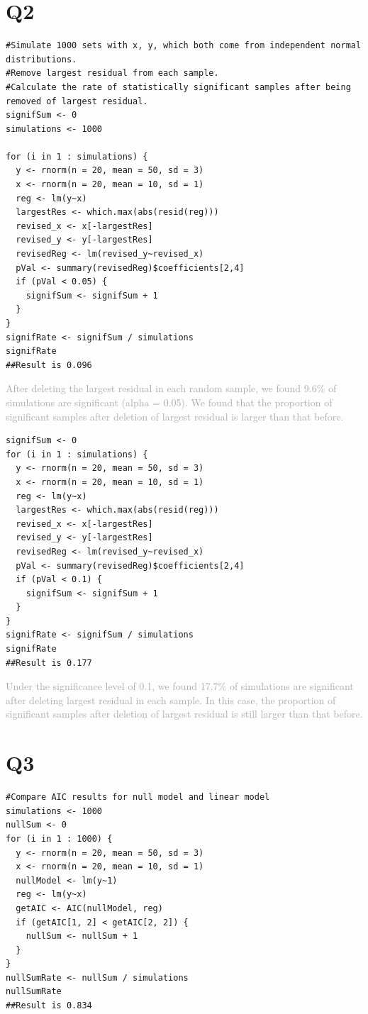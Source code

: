 \documentclass[12pt]{article}
\begin{document}
\section*{Q2}
\begin{verbatim}
#Simulate 1000 sets with x, y, which both come from independent normal distributions.
#Remove largest residual from each sample.
#Calculate the rate of statistically significant samples after being removed of largest residual.
signifSum <- 0
simulations <- 1000

for (i in 1 : simulations) {
  y <- rnorm(n = 20, mean = 50, sd = 3)
  x <- rnorm(n = 20, mean = 10, sd = 1)
  reg <- lm(y~x)
  largestRes <- which.max(abs(resid(reg)))
  revised_x <- x[-largestRes]
  revised_y <- y[-largestRes]
  revisedReg <- lm(revised_y~revised_x)
  pVal <- summary(revisedReg)$coefficients[2,4]
  if (pVal < 0.05) {
    signifSum <- signifSum + 1
  }
}
signifRate <- signifSum / simulations
signifRate
##Result is 0.096
\end{verbatim}

\noindent \textcolor{darkgray}{After deleting the largest residual in each random sample, we found 9.6$\%$ of simulations are significant (alpha = 0.05). We found that the proportion of significant samples after deletion of largest residual is larger than that before.}

\begin{verbatim}
signifSum <- 0
for (i in 1 : simulations) {
  y <- rnorm(n = 20, mean = 50, sd = 3)
  x <- rnorm(n = 20, mean = 10, sd = 1)
  reg <- lm(y~x)
  largestRes <- which.max(abs(resid(reg)))
  revised_x <- x[-largestRes]
  revised_y <- y[-largestRes]
  revisedReg <- lm(revised_y~revised_x)
  pVal <- summary(revisedReg)$coefficients[2,4]
  if (pVal < 0.1) {
    signifSum <- signifSum + 1
  }
}
signifRate <- signifSum / simulations
signifRate
##Result is 0.177
\end{verbatim}

\noindent \textcolor{darkgray}{Under the significance level of 0.1, we found 17.7$\%$ of simulations are significant after deleting largest residual in each sample. In this case, the proportion of significant samples after deletion of largest residual is still larger than that before.}

\section*{Q3}
\begin{verbatim}
#Compare AIC results for null model and linear model
simulations <- 1000
nullSum <- 0
for (i in 1 : 1000) {
  y <- rnorm(n = 20, mean = 50, sd = 3)
  x <- rnorm(n = 20, mean = 10, sd = 1)
  nullModel <- lm(y~1)
  reg <- lm(y~x)
  getAIC <- AIC(nullModel, reg)
  if (getAIC[1, 2] < getAIC[2, 2]) {
    nullSum <- nullSum + 1
  }
}
nullSumRate <- nullSum / simulations
nullSumRate
##Result is 0.834
\end{verbatim}
\end{document}
